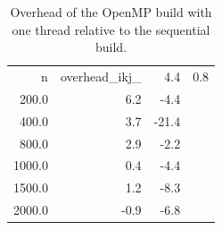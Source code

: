 \begin{table}[ht]
\centering
\small
\begin{tabular}{rrr}
\hline
n & overhead\_ikj\_%
 & 4.4 & 0.8 \\
200.0 & 6.2 & -4.4 \\
400.0 & 3.7 & -21.4 \\
800.0 & 2.9 & -2.2 \\
1000.0 & 0.4 & -4.4 \\
1500.0 & 1.2 & -8.3 \\
2000.0 & -0.9 & -6.8 \\
\hline
\end{tabular}
\caption{Overhead of the OpenMP build with one thread relative to the sequential build.}
\label{tab:overhead_1thread}
\end{table}
